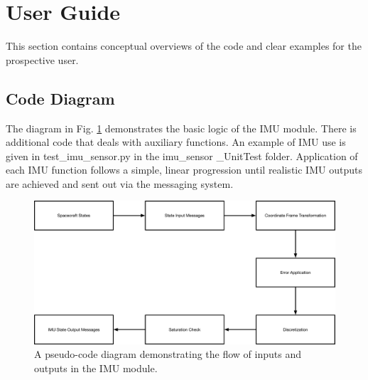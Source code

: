 \section{User Guide}
This section contains conceptual overviews of the code and clear examples for the prospective user. 

\subsection{Code Diagram}
The diagram in Fig. \ref{img:codeFlow} demonstrates the basic logic of the IMU module. There is additional code that deals with auxiliary functions.  An example of IMU use is given in test\_imu\_sensor.py in the imu\_sensor \_UnitTest folder. Application of each IMU function follows a simple, linear progression until realistic IMU outputs are achieved and sent out via the messaging system.

\begin{figure}[H]
	\centering \includegraphics[height=0.4\textwidth, keepaspectratio]{Figures/codeFlow.pdf}
	\caption{A pseudo-code diagram demonstrating the flow of inputs and outputs in the IMU module.}
	\label{img:codeFlow}
\end{figure}

